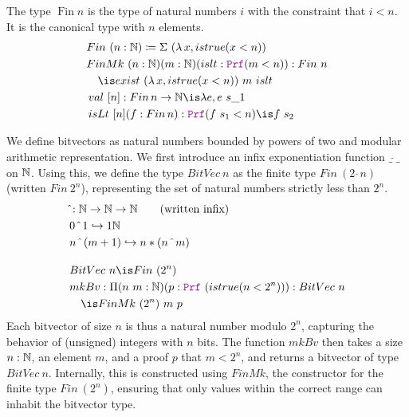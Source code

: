 \begin{definition}[Fin]\label{def:fin-def}
The type $\mathop{Fin} n$ is the type of natural numbers $i$ with the constraint that $i < n$.
It is the canonical type with $n$ elements.
\begin{align*}
& Fin~(n: \N) \coloneq \Sigma~(\lambda\,x, istrue(x < n)) \\
& FinMk~(n: \N) (m: \N) (islt: \prf (m < n)) : Fin~n \\
&\quad\is exist~(\lambda\,x, istrue(x <n))~m~islt\\
&\mathop{val}~[n]: \mathop{Fin} n \ra \N \is \lambda e, e~s\_1 \\
&\mathop{isLt}~[n] (f: \mathop{Fin} n): \prf (f~s_1 < n) \is f~s_2\\
\end{align*}
\end{definition}

\begin{definition}[Bitvector]\label{def:bv-def}
We define bitvectors as natural numbers bounded by powers of two and modular arithmetic representation.
We first introduce an infix exponentiation function $\_\,\hat{}\,\_$ on $\mathbb{N}$.
Using this, we define the type $BitVec~n$ as the finite type $Fin~(2~\hat~n)$ (written $Fin~2^n$), representing the set of natural numbers strictly less than $2^n$.
\begin{align*}
& \hat{}: \N \ra \N \ra \N \qquad \text{(written inﬁx)}\\
& 0 ~\hat{}~ 1 \re 1 \N\\
& n ~\hat{}~ (m + 1) \re n * (n ~\hat{}~ m)\\[1em]
&BitVec~n \is Fin~(2^n) \\
& mkBv: \Pi(n~m: \N)(p: \prf~(istrue(n < 2^n))): BitVec~n\\
&\quad\is FinMk~(2^n)~m~p
\end{align*}
Each bitvector of size $n$ is thus a natural number modulo $2^n$, capturing the behavior of (unsigned) integers with $n$ bits.
The function $mkBv$ then takes a size $n: \mathbb{N}$, an element $m$, and a proof $p$ that $m < 2^n$, and returns a bitvector of type $BitVec~n$.
Internally, this is constructed using $FinMk$, the constructor for the finite type $Fin~(2^n)$, ensuring that only values within the correct range can inhabit the bitvector type.
\end{definition}

